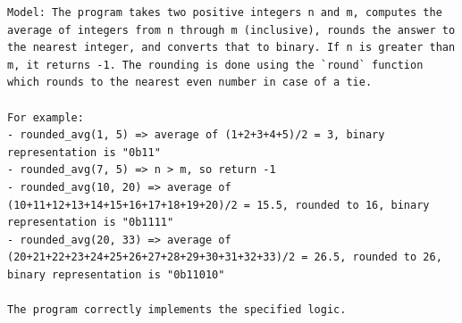 \begin{lstlisting}[frame=single]
Model: The program takes two positive integers n and m, computes the average of integers from n through m (inclusive), rounds the answer to the nearest integer, and converts that to binary. If n is greater than m, it returns -1. The rounding is done using the `round` function which rounds to the nearest even number in case of a tie.

For example:
- rounded_avg(1, 5) => average of (1+2+3+4+5)/2 = 3, binary representation is "0b11"
- rounded_avg(7, 5) => n > m, so return -1
- rounded_avg(10, 20) => average of (10+11+12+13+14+15+16+17+18+19+20)/2 = 15.5, rounded to 16, binary representation is "0b1111"
- rounded_avg(20, 33) => average of (20+21+22+23+24+25+26+27+28+29+30+31+32+33)/2 = 26.5, rounded to 26, binary representation is "0b11010"

The program correctly implements the specified logic.
\end{lstlisting}

